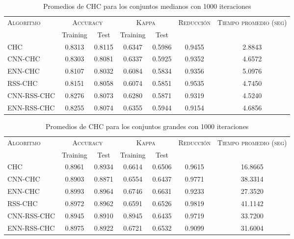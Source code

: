 \begin{table}[]
\centering
\begin{tabular}{l c c c c c c}
\hline
\multirow{2}{*}{\textsc{Algoritmo}}
	& \multicolumn{2}{c}{\textsc{Accuracy}}
	& \multicolumn{2}{c}{\textsc{Kappa}}
	& \textsc{Reducción}
	& \textsc{Tiempo promedio (seg)} \\
	& Training & Test
	& Training & Test \\ 
\hline
\hline

CHC & 0.8313 & 0.8115 & 0.6347 & 0.5986 & 0.9455 & 2.8843 \\
CNN-CHC & 0.8303 & 0.8081 & 0.6337 & 0.5925 & 0.9352 & 4.6572 \\
ENN-CHC & 0.8107 & 0.8032 & 0.6084 & 0.5834 & 0.9356 & 5.0976 \\
RSS-CHC & 0.8151 & 0.8058 & 0.6074 & 0.5851 & 0.9535 & 4.7450 \\
CNN-RSS-CHC & 0.8276 & 0.8073 & 0.6280 & 0.5871 & 0.9319 & 4.5240 \\
ENN-RSS-CHC  & 0.8255 & 0.8074 & 0.6355 & 0.5944 & 0.9154 & 4.6856 \\

\hline
\end{tabular}
\caption{Promedios de CHC para los conjuntos medianos con 1000 iteraciones}
\label{med-chc}
\end{table}


\begin{table}[]
\centering
\begin{tabular}{l c c c c c c}
\hline
\multirow{2}{*}{\textsc{Algoritmo}}
	& \multicolumn{2}{c}{\textsc{Accuracy}}
	& \multicolumn{2}{c}{\textsc{Kappa}}
	& \textsc{Reducción}
	& \textsc{Tiempo promedio (seg)} \\
	& Training & Test
	& Training & Test \\ 
\hline
\hline

CHC  & 0.8961 & 0.8934 & 0.6614 & 0.6506 & 0.9615 & 16.8665 \\
CNN-CHC & 0.8903 & 0.8871 & 0.6554 & 0.6437 & 0.9771 & 38.3314 \\
ENN-CHC & 0.8993 & 0.8964 & 0.6746 & 0.6631 & 0.9233 & 27.3520 \\
RSS-CHC & 0.8972 & 0.8962 & 0.6591 & 0.6526 & 0.9819 & 41.1142 \\
CNN-RSS-CHC & 0.8945 & 0.8910 & 0.8945 & 0.6435 & 0.9719 & 33.7200 \\
ENN-RSS-CHC & 0.8975 & 0.8922 & 0.6721 & 0.6532 & 0.9099 & 31.6004 \\

\hline
\end{tabular}
\caption{Promedios de CHC para los conjuntos grandes con 1000 iteraciones}
\label{grande-chc}
\end{table}

